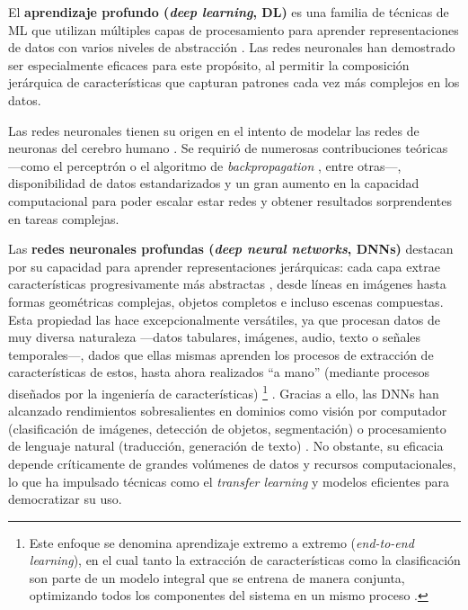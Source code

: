 El \textbf{aprendizaje profundo (\textit{deep learning}, DL)} es una familia de técnicas de ML que utilizan 
múltiples capas de procesamiento para aprender representaciones de datos con varios niveles de abstracción
\cite{lecun2015}. Las redes neuronales han demostrado ser especialmente eficaces para este propósito, al 
permitir la composición jerárquica de características que capturan patrones cada vez más complejos en los 
datos.

Las redes neuronales tienen su origen en el intento de modelar las redes de neuronas del cerebro humano 
\cite{mcculloch1943}. Se requirió de numerosas contribuciones teóricas ---como el perceptrón 
\cite{rosenblatt1958} o el algoritmo de \textit{backpropagation} \cite{rumelhart1986,werbos1994}, entre 
otras---, disponibilidad de datos estandarizados y un gran aumento en la capacidad computacional para poder 
escalar estar redes y obtener resultados 
sorprendentes en tareas complejas.

Las \textbf{redes neuronales profundas (\textit{deep neural networks}, DNNs)} destacan por su capacidad para 
aprender representaciones jerárquicas: cada capa extrae características progresivamente más abstractas 
\cite{lecun2015}, desde líneas en imágenes hasta formas geométricas complejas, objetos completos e incluso 
escenas compuestas.
Esta propiedad las hace excepcionalmente versátiles, ya que procesan datos de muy diversa naturaleza ---datos 
tabulares, imágenes, audio, texto o señales temporales---, dados que ellas mismas aprenden los procesos de 
extracción de características de estos, hasta ahora realizados ``a mano'' (mediante procesos diseñados por la 
ingeniería de características)%
\footnote{
    Este enfoque se denomina aprendizaje extremo a extremo (\textit{end-to-end learning}), en el cual tanto la 
    extracción de características como la clasificación son parte de un modelo integral que se entrena de 
    manera conjunta, optimizando todos los componentes del sistema en un mismo proceso \cite{rusell2021}.
}
\cite{rusell2021}. 
Gracias a ello, las DNNs han alcanzado rendimientos sobresalientes en dominios como visión por computador 
(clasificación de imágenes, detección de objetos, segmentación) o procesamiento de lenguaje natural 
(traducción, generación de texto) \cite{redhat2024DeepLearningDefinition}.
No obstante, su eficacia depende críticamente de grandes volúmenes de datos y recursos computacionales, lo que 
ha impulsado técnicas como el \textit{transfer learning} y modelos eficientes para democratizar su uso.


